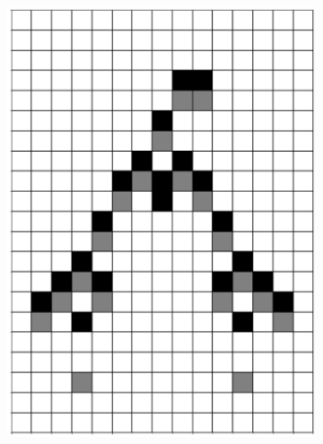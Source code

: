 \documentclass[12pt]{article}
\numberwithin{figure}{section} %
\begin{document}
\begin{figure}[H]
\begin{subfigure}{0.19\textwidth}
     		\includegraphics[width=\linewidth]{Section4/26.2}
     		\subcaption{}
   	\end{subfigure}
        	\begin{subfigure}{0.19\textwidth}
     		\centering

\end{subfigure}
\end{figure}
\end{document}
